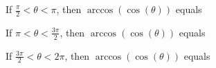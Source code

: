 \documentclass{ximera}
\begin{document}
\begin{question}


If $\frac{\pi}{2} < \theta < \pi$, then $\arccos(\cos(\theta))$ equals

\begin{multipleChoice}
\choice[correct] {$\theta$}
\choice {$\pi - \theta$}
\choice {$\pi + \theta$}
\choice {$2\pi - \theta$}
\end{multipleChoice}

\end{question}






\begin{question}


If $\pi < \theta < \frac{3\pi}{2}$, then $\arccos(\cos(\theta))$ equals

\begin{multipleChoice}
\choice {$\theta$}
\choice {$\pi - \theta$}
\choice {$\pi + \theta$}
\choice[correct] {$2\pi - \theta$}
\end{multipleChoice}

\end{question}






\begin{question}


If $\frac{3\pi}{2} < \theta < 2\pi$, then $\arccos(\cos(\theta))$ equals

\begin{multipleChoice}
\choice {$\theta$}
\choice {$\pi - \theta$}
\choice {$\pi + \theta$}
\choice[correct] {$2\pi - \theta$}
\end{multipleChoice}

\end{question}
\end{document}
